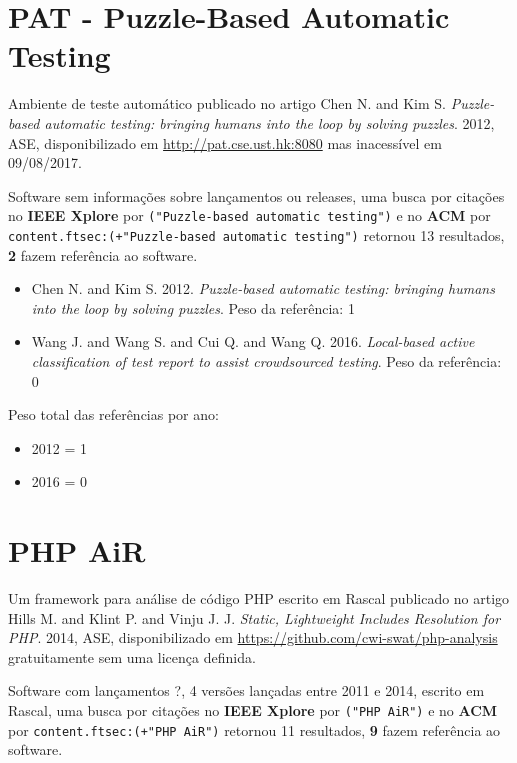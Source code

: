 \section{PAT - Puzzle-Based Automatic Testing}

Ambiente de teste automático
publicado no artigo
Chen N. and Kim S.
{\it Puzzle-based automatic testing: bringing humans into the loop by solving puzzles}.
2012,
ASE,
disponibilizado em \url{http://pat.cse.ust.hk:8080}
mas inacessível em 09/08/2017.

Software sem informações sobre lançamentos ou releases,
uma busca por citações no {\bf IEEE Xplore} por
\texttt{("Puzzle-based automatic testing")}
e no {\bf ACM} por
\texttt{content.ftsec:(+"Puzzle-based automatic testing")}
retornou
13 resultados,
{\bf 2} fazem referência ao software.

\begin{itemize}
\item Chen N. and Kim S.
      2012.
      {\it Puzzle-based automatic testing: bringing humans into the loop by solving puzzles}.
      Peso da referência: 1
\item Wang J. and Wang S. and Cui Q. and Wang Q.
      2016.
      {\it Local-based active classification of test report to assist crowdsourced testing}.
      Peso da referência: 0
\end{itemize}

Peso total das referências por ano:

\begin{itemize}
\item 2012 = 1
\item 2016 = 0
\end{itemize}


\section{PHP AiR}

Um framework para análise de código PHP escrito em Rascal
publicado no artigo
Hills M. and Klint P. and Vinju J. J.
{\it Static, Lightweight Includes Resolution for PHP}.
2014,
ASE,
disponibilizado em \url{https://github.com/cwi-swat/php-analysis}
gratuitamente
sem uma licença definida.

Software com lançamentos ?,
4 versões lançadas
entre 2011 e 2014,
escrito em Rascal,
uma busca por citações no {\bf IEEE Xplore} por
\texttt{("PHP AiR")}
e no {\bf ACM} por
\texttt{content.ftsec:(+"PHP AiR")}
retornou
11 resultados,
{\bf 9} fazem referência ao software.

